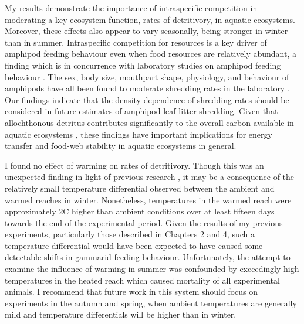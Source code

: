My results demonstrate the importance of intraspecific competition in moderating a key ecosystem function, rates of detritivory, in aquatic ecosystems. Moreover, these effects also appear to vary seasonally, being stronger in winter than in summer. Intraspecific competition for resources is a key driver of amphipod feeding behaviour even when food resources are relatively abundant, a finding which is in concurrence with laboratory studies on amphipod feeding behaviour \citep{mancinelli2012, labaude2016, vandervorste2017}. The sex, body size, mouthpart shape, physiology, and behaviour of amphipods have all been found to moderate shredding rates in the laboratory \citep{rota2018}. Our findings indicate that the density-dependence of shredding rates should be considered in future estimates of amphipod leaf litter shredding. Given that allochthonous detritus contributes significantly to the overall carbon available in aquatic ecosystems \citep{wallace1997}, these findings have important implications for energy transfer and food-web stability in aquatic ecosystems in general.

I found no effect of warming on rates of detritivory. Though this was an unexpected finding in light of previous research \citep{labaude2016, pellan2016, laverty2017, Chapter 4}, it may be a consequence of the relatively small temperature differential observed between the ambient and warmed reaches in winter. Nonetheless, temperatures in the warmed reach were approximately 2\degree C higher than ambient conditions over at least fifteen days towards the end of the experimental period. Given the results of my previous experiments, particularly those described in Chapters 2 and 4, such a temperature differential would have been expected to have caused some detectable shifts in gammarid feeding behaviour. Unfortunately, the attempt to examine the influence of warming in summer was confounded by exceedingly high temperatures in the heated reach which caused mortality of all experimental animals. I recommend that future work in this system should focus on experiments in the autumn and spring, when ambient temperatures are generally mild and temperature differentials will be higher than in winter. 

